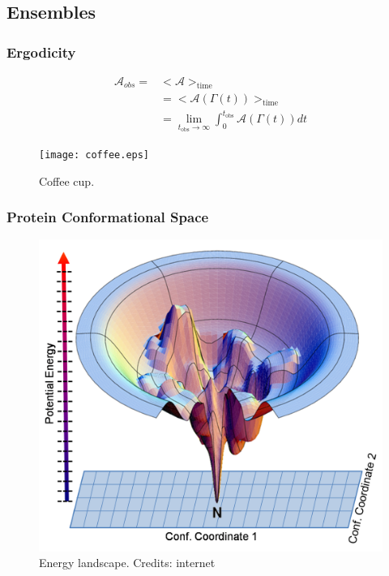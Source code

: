 \documentclass{beamer}
\begin{document}
\subsection{Ensembles} 

\begin{frame}\frametitle{Ergodicity}


\fboxsep=0pt
\noindent %
\begin{minipage}[t]{0.48\linewidth}

\begin{equation}
\begin{aligned}
\mathcal{A}_{obs} =  &  <\mathcal{A}>_{\mathrm{time}} \\
&= <\mathcal{A}(\Gamma (t))>_{\mathrm{time}}  \\
&= \lim_{t_{\mathrm{obs}} \rightarrow \infty } \int_0^{t_{\mathrm{obs}}}
\mathcal{A}(\Gamma (t)) dt
\end{aligned}
\end{equation}


\end{minipage}
\hfill%
\begin{minipage}[t]{0.48\linewidth}
\begin{figure}
\texttt{[image: coffee.eps]}
\caption{{\scriptsize  Coffee cup. }}
\end{figure}

\end{minipage}

\end{frame}

\begin{frame}\frametitle{Protein Conformational Space}

\begin{figure}
\includegraphics[scale=0.33]{landscape.png}
\caption{{\scriptsize Energy landscape. Credits: internet}}
\end{figure}

\end{frame}
\end{document}
